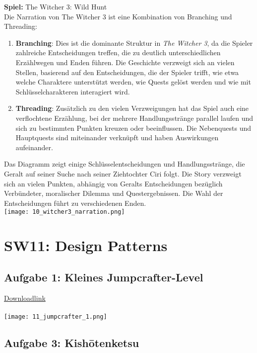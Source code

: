 \documentclass{article}
\begin{document}
\textbf{Spiel:} The Witcher 3: Wild Hunt
\\
Die Narration von The Witcher 3 ist eine Kombination von Branching und Threading:
\begin{enumerate}
  \item \textbf{Branching}: Dies ist die dominante Struktur in \textit{The Witcher 3}, da die Spieler zahlreiche Entscheidungen
  treffen, die zu deutlich unterschiedlichen Erzählwegen und Enden führen. Die Geschichte verzweigt sich an vielen Stellen,
  basierend auf den Entscheidungen, die der Spieler trifft, wie etwa welche Charaktere unterstützt werden, wie Quests gelöst werden
  und wie mit Schlüsselcharakteren interagiert wird.
  \item \textbf{Threading}: Zusätzlich zu den vielen Verzweigungen hat das Spiel auch eine verflochtene Erzählung, bei der mehrere
  Handlungsstränge parallel laufen und sich zu bestimmten Punkten kreuzen oder beeinflussen. Die Nebenquests und Hauptquests sind
  miteinander verknüpft und haben Auswirkungen aufeinander.
\end{enumerate}
\bigskip
Das Diagramm zeigt einige Schlüsselentscheidungen und Handlungsstränge, die Geralt auf seiner Suche nach seiner Ziehtochter Ciri
folgt. Die Story verzweigt sich an vielen Punkten, abhängig von Geralts Entscheidungen bezüglich Verbündeter, moralischer Dilemma
und Questergebnissen. Die Wahl der Entscheidungen führt zu verschiedenen Enden.
\\
\texttt{[image: 10\_witcher3\_narration.png]}

\section{SW11: Design Patterns}

\subsection{Aufgabe 1: Kleines Jumpcrafter-Level}

\href{https://hsluzern-my.sharepoint.com/:u:/g/personal/david_hodel_stud_hslu_ch/Ea4OqG_pyeNEls8wVq7Zn8cB2uJQy9jvlJaBs3AFmZM3cw?e=mSX9NU}{Downloadlink}
\\ \\
\texttt{[image: 11\_jumpcrafter\_1.png]}

\subsection{Aufgabe 3: Kishōtenketsu}
\end{document}
